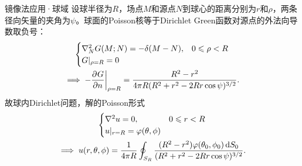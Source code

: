 \begin{example}{镜像法应用·球域}{}
	设球半径为$R$，场点$M$和源点$N$到球心的距离分别为$r$和$\rho$，两条径向矢量的夹角为$\psi$。球面的Poisson核等于Dirichlet Green函数对源点的外法向导数取负号：
	\begin{gather}
		\begin{cases}
			\nabla^2_N G(M;N) = -\delta(M - N),&0 \leqslant \rho < R\\
			{G}\rvert_{\rho=R} = 0
		\end{cases}\notag\\
		\implies -{\frac{\partial^{}G}{\partial{n}^{}}}\biggr\rvert_{\rho=R} = \frac{R^2 - r^2}{4\pi R(R^2 + r^2 - 2Rr\cos\psi)^{3/2}}.\label{eq:mmp-ball-poisson-kernel}
	\end{gather}
	故球内Dirichlet问题，解的Poisson形式
	\begin{gather}
		\begin{cases}
			\nabla^2 u = 0,&0 \leqslant r < R\\
			{u}\rvert_{r=R} = \varphi(\theta,\phi)
		\end{cases}\notag\\
		\implies u(r,\theta,\phi) = \frac1{4\pi R}\oint_{S_R}\frac{(R^2 - r^2)\varphi(\theta_0,\phi_0)\mathop{}\!\mathrm{d} S_0}{(R^2 + r^2 - 2Rr\cos\psi)^{3/2}}.\label{eq:mmp-ball-poisson-integral}
	\end{gather}
\end{example}

